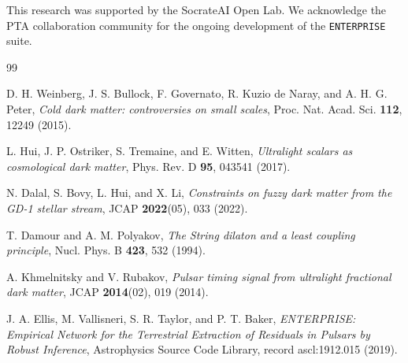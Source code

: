 \documentclass[aps,prd,twocolumn,nofootinbib,superscriptaddress,10pt]{revtex4-2}
\begin{document}
\begin{acknowledgments}
This research was supported by the SocrateAI Open Lab. We acknowledge the PTA collaboration community for the ongoing development of the \texttt{ENTERPRISE} suite.
\end{acknowledgments}


\begin{thebibliography}{99}

D. H. Weinberg, J. S. Bullock, F. Governato, R. Kuzio de Naray, and A. H. G. Peter, 
\textit{Cold dark matter: controversies on small scales},
Proc. Nat. Acad. Sci. \textbf{112}, 12249 (2015).

L. Hui, J. P. Ostriker, S. Tremaine, and E. Witten,
\textit{Ultralight scalars as cosmological dark matter},
Phys. Rev. D \textbf{95}, 043541 (2017).

N. Dalal, S. Bovy, L. Hui, and X. Li,
\textit{Constraints on fuzzy dark matter from the GD-1 stellar stream},
JCAP \textbf{2022}(05), 033 (2022).

T. Damour and A. M. Polyakov,
\textit{The String dilaton and a least coupling principle},
Nucl. Phys. B \textbf{423}, 532 (1994).

A. Khmelnitsky and V. Rubakov,
\textit{Pulsar timing signal from ultralight fractional dark matter},
JCAP \textbf{2014}(02), 019 (2014).

J. A. Ellis, M. Vallisneri, S. R. Taylor, and P. T. Baker,
\textit{ENTERPRISE: Empirical Network for the Terrestrial Extraction of Residuals in Pulsars by Robust Inference},
Astrophysics Source Code Library, record ascl:1912.015 (2019).

\end{thebibliography}
\end{document}
